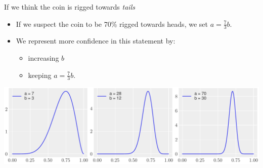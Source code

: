 \documentclass[
  13pt,
  ignorenonframetext,
]{beamer}
\providecommand{\tightlist}{%
  \setlength{\itemsep}{0pt}\setlength{\parskip}{0pt}}
\begin{document}
\begin{frame}{If we think the coin is rigged towards \emph{tails}}
\protect\hypertarget{if-we-think-the-coin-is-rigged-towards-tails}{}
\begin{itemize}
\item
  If we suspect the coin to be 70\% rigged towards heads, we set
  \(a=\frac{7}{3}b\).
\item
  We represent more confidence in this statement by:

  \begin{itemize}
  \tightlist
  \item
    increasing \(b\)
  \item
    keeping \(a=\frac{7}{3}b\).
  \end{itemize}
\end{itemize}

\begin{center}\includegraphics{3-coinTossing_files/figure-beamer/unnamed-chunk-4-5} \end{center}
\end{frame}
\end{document}
